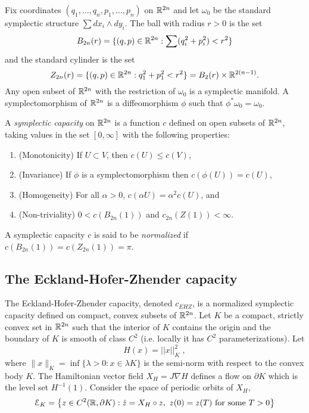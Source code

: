 \documentclass[../capacities_main.tex]{subfiles}
\begin{document}
	
	
	
	Fix coordinates $(q_1, \ldots ,q_n,p_1, \ldots ,p_n)$ on ${\mathbb R}^{2n}$ and let $\omega_0$ be the standard symplectic structure $\sum dx_i\wedge dy_i$.  The ball with radius $r>0$ is the set 
	\begin{equation*}
	B_{2n}(r) = \{ (q,p) \in {\mathbb R}^{2n} : \sum (q_i^2 + p_i^2)< r^2 \}
	\end{equation*}
	and the standard cylinder is the set 
	\begin{equation*}
	Z_{2n}(r) = \{ (q,p) \in {\mathbb R}^{2n} : q_1^2 + p_1^2< r^2 \} = B_2(r) \times {\mathbb R}^{2(n-1)}.
	\end{equation*}
	Any open subset of ${\mathbb R}^{2n}$ with the restriction of $\omega_0$ is a symplectic manifold.  A symplectomorphism of ${\mathbb R}^{2n}$ is a diffeomorphism $\phi$ such that $\phi^*\omega_0 = \omega_0$.
	
	\begin{Definition}
		A \emph{symplectic capacity} on ${\mathbb R}^{2n}$ is a function $c$ defined on open subsets of ${\mathbb R}^{2n}$, taking values in the set $[0,\infty]$ with the following properties:
		\begin{enumerate}
			\item (Monotonicity) If $U \subset V$, then $c(U) \leq c(V)$,
			\item (Invariance) If $\phi$ is a symplectomorphism then $c(\phi(U)) = c(U)$,
			\item (Homogeneity) For all $\alpha >0$, $c(\alpha U) = \alpha^2 c(U)$, and
			\item (Non-triviality) $0 < c(B_{2n}(1))$ and $c_{2n}(Z(1)) < \infty$.
		\end{enumerate}
		A symplectic capacity $c$ is said to be \emph{normalized} if $c(B_{2n}(1)) = c(Z_{2n}(1)) = \pi$.
	\end{Definition}
	
	\subsection{The Eckland-Hofer-Zhender capacity}
	
	The Eckland-Hofer-Zhender capacity, denoted $c_{EHZ}$, is a normalized symplectic capacity defined on compact, convex subsets of ${\mathbb R}^{2n}$. Let $K$ be a compact, strictly convex set in ${\mathbb R}^{2n}$ such that the interior of $K$ contains the origin and the boundary of $K$ is smooth of class $C^2$ (i.e. locally it has $C^2$ parameterizations).  Let
	\begin{equation*}
	H(x) = ||x||_K^2 \;,
	\end{equation*}
	where $\|x\|_K = \inf \{ \lambda > 0 : x\in \lambda K \}$ is the semi-norm with respect to the convex body $K$. 
	The Hamiltonian vector field $X_H = J\nabla H$ defines a flow on $\partial K$ which is the level set $H^{-1}(1)$.  Consider the space of periodic orbits of $X_H$, 
	\begin{equation*}
	\mathcal{E}_K = \left\{ z \in C^2( {\mathbb R},\partial K) : \dot z = X_H\circ z,\ z(0)=z(T) \text{ for some }T>0\right\}
	\end{equation*}
	
\end{document}
